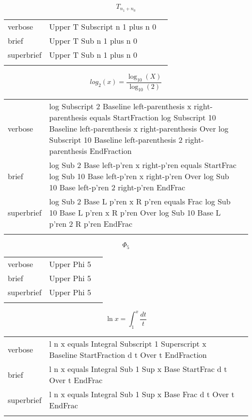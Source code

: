 \E \[T_{n_1+n_0}\]
\begin{longtable}[c]{@{}lll@{}}
\toprule\addlinespace
verbose & Upper T Subscript n 1 plus n 0 &

\\\addlinespace
brief & Upper T Sub n 1 plus n 0 &

\\\addlinespace
superbrief & Upper T Sub n 1 plus n 0 &

\\\addlinespace
\bottomrule
\end{longtable}


\E \[log_2(x)=\frac{\log_{10}(X)}{\log_{10}(2)}\]
\begin{longtable}[c]{@{}lll@{}}
\toprule\addlinespace
verbose & log Subscript 2 Baseline left-parenthesis x right-parenthesis
equals StartFraction log Subscript 10 Baseline left-parenthesis x
right-parenthesis Over log Subscript 10 Baseline left-parenthesis 2
right-parenthesis EndFraction &

\\\addlinespace
brief & log Sub 2 Base left-p'ren x right-p'ren equals StartFrac log Sub
10 Base left-p'ren x right-p'ren Over log Sub 10 Base left-p'ren 2
right-p'ren EndFrac &

\\\addlinespace
superbrief & log Sub 2 Base L p'ren x R p'ren equals Frac log Sub 10
Base L p'ren x R p'ren Over log Sub 10 Base L p'ren 2 R p'ren EndFrac &

\\\addlinespace
\bottomrule
\end{longtable}


\E \[\Phi_5\]
\begin{longtable}[c]{@{}lll@{}}
\toprule\addlinespace
verbose & Upper Phi 5 &

\\\addlinespace
brief & Upper Phi 5 &

\\\addlinespace
superbrief & Upper Phi 5 &

\\\addlinespace
\bottomrule
\end{longtable}


\E \[\ln x = \int_1^x \frac{dt}{t}\]
\begin{longtable}[c]{@{}lll@{}}
\toprule\addlinespace
verbose & l n x equals Integral Subscript 1 Superscript x Baseline
StartFraction d t Over t EndFraction &

\\\addlinespace
brief & l n x equals Integral Sub 1 Sup x Base StartFrac d t Over t
EndFrac &

\\\addlinespace
superbrief & l n x equals Integral Sub 1 Sup x Base Frac d t Over t
EndFrac &

\\\addlinespace
\bottomrule
\end{longtable}


